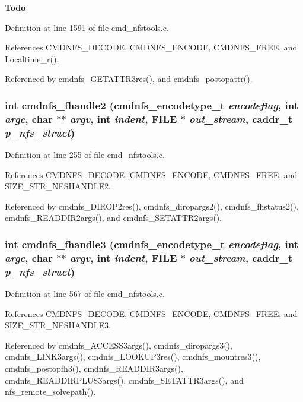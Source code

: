 \begin{Desc}
\item[{\bf Todo}]\end{Desc}


Definition at line 1591 of file cmd\_\-nfstools.c.

References CMDNFS\_\-DECODE, CMDNFS\_\-ENCODE, CMDNFS\_\-FREE, and Localtime\_\-r().

Referenced by cmdnfs\_\-GETATTR3res(), and cmdnfs\_\-postopattr().
\subsubsection{\setlength{\rightskip}{0pt plus 5cm}int cmdnfs\_\-fhandle2 ({\bf cmdnfs\_\-encodetype\_\-t} {\em encodeflag}, int {\em argc}, char $\ast$$\ast$ {\em argv}, int {\em indent}, FILE $\ast$ {\em out\_\-stream}, caddr\_\-t {\em p\_\-nfs\_\-struct})}\label{cmd__nfstools_8h_a18}




Definition at line 255 of file cmd\_\-nfstools.c.

References CMDNFS\_\-DECODE, CMDNFS\_\-ENCODE, CMDNFS\_\-FREE, and SIZE\_\-STR\_\-NFSHANDLE2.

Referenced by cmdnfs\_\-DIROP2res(), cmdnfs\_\-diropargs2(), cmdnfs\_\-fhstatus2(), cmdnfs\_\-READDIR2args(), and cmdnfs\_\-SETATTR2args().
\subsubsection{\setlength{\rightskip}{0pt plus 5cm}int cmdnfs\_\-fhandle3 ({\bf cmdnfs\_\-encodetype\_\-t} {\em encodeflag}, int {\em argc}, char $\ast$$\ast$ {\em argv}, int {\em indent}, FILE $\ast$ {\em out\_\-stream}, caddr\_\-t {\em p\_\-nfs\_\-struct})}\label{cmd__nfstools_8h_a22}




Definition at line 567 of file cmd\_\-nfstools.c.

References CMDNFS\_\-DECODE, CMDNFS\_\-ENCODE, CMDNFS\_\-FREE, and SIZE\_\-STR\_\-NFSHANDLE3.

Referenced by cmdnfs\_\-ACCESS3args(), cmdnfs\_\-diropargs3(), cmdnfs\_\-LINK3args(), cmdnfs\_\-LOOKUP3res(), cmdnfs\_\-mountres3(), cmdnfs\_\-postopfh3(), cmdnfs\_\-READDIR3args(), cmdnfs\_\-READDIRPLUS3args(), cmdnfs\_\-SETATTR3args(), and nfs\_\-remote\_\-solvepath().

